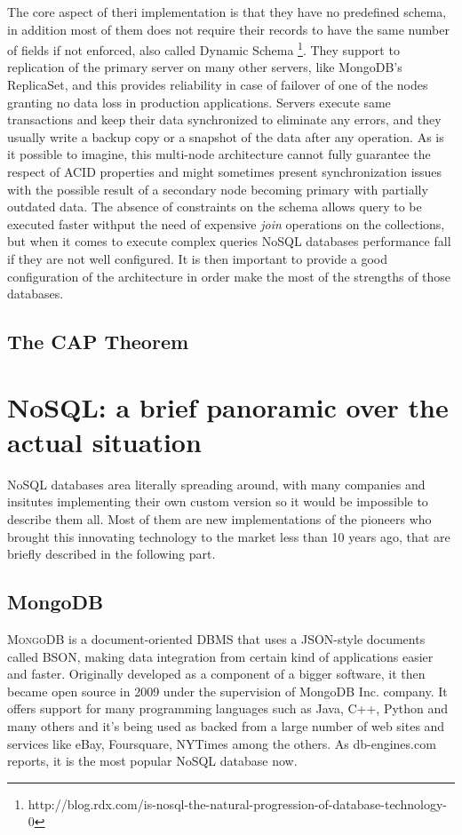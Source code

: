 The core aspect of theri implementation is that they have no predefined schema, in addition most of them does not require their records to have the same number of fields if not enforced, also called Dynamic Schema \footnote{http://blog.rdx.com/is-nosql-the-natural-progression-of-database-technology-0}.
They support to replication of the primary server on many other servers, like MongoDB’s ReplicaSet, and this provides reliability in case of failover of one of the nodes granting no data loss in production applications. Servers execute same transactions and keep their data synchronized to eliminate any errors, and they usually write a backup copy or a snapshot of the data after any operation. As is it possible to imagine, this multi-node architecture cannot fully guarantee the respect of ACID properties and might sometimes present synchronization issues with the possible result of a secondary node becoming primary with partially outdated data.
The absence of constraints on the schema allows query to be executed faster withput the need of expensive \textit{join} operations on the collections, but when it comes to execute complex queries NoSQL databases performance fall if they are not well configured.
It is then important to provide a good configuration of the architecture in order make the most of the strengths of those databases.




\subsection{The CAP Theorem}

\section {NoSQL: a brief panoramic over the actual situation}
NoSQL databases area literally spreading around, with many companies and insitutes implementing their own custom version so it would be impossible to describe them all. 
Most of them are new implementations of the pioneers who brought this innovating technology to the market less than 10 years ago, that are briefly described in the following part.

\subsection{MongoDB}
\textsc{MongoDB} is a document-oriented DBMS that uses a JSON-style documents called BSON, making data integration from certain kind of applications easier and faster.
Originally developed as a component of a bigger software, it then became open source in 2009 under the supervision of MongoDB Inc. company.
It offers support for many programming languages such as Java, C++, Python and many others and it’s being used as backed from a large number of web sites and services like eBay, Foursquare, NYTimes among the others.
As db-engines.com reports, it is the most popular NoSQL database now.


